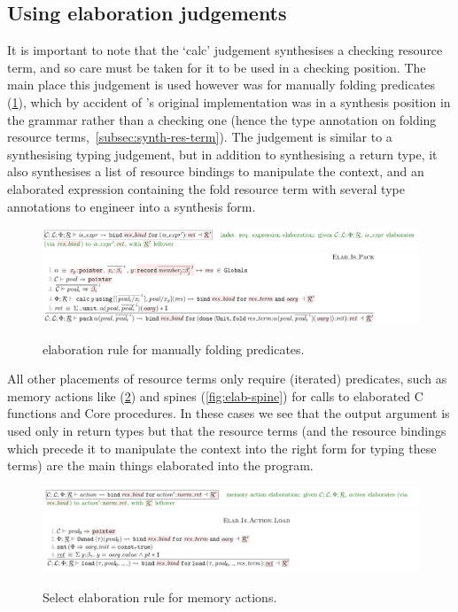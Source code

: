 \subsection{Using elaboration judgements}

It is important to note that the `calc' judgement synthesises a checking
resource term, and so care must be taken for it to be used in a checking
position. The main place this judgement is used however was for manually
folding predicates (\cref{fig:kernel-elab-fold}), which by accident of 's
original implementation was in a synthesis position in the grammar rather than
a checking one (hence the type annotation on folding resource
terms,~\cref{subsec:synth-res-term}). The judgement is similar to a
synthesising typing judgement, but in addition to synthesising a return type,
it also synthesises a list of resource bindings to manipulate the context, and
an elaborated expression containing the fold resource term with several type
annotations to engineer into a synthesis form.

\begin{figure}[tp]
    \includegraphics{figures/kernel-elab-fold-1}
    \includegraphics{figures/kernel-elab-fold-2}
    \caption{ elaboration rule for manually folding
        predicates.}\label{fig:kernel-elab-fold}
\end{figure}

All other placements of resource terms only require (iterated) predicates, such
as memory actions like  (\cref{fig:elab-action}) and spines
(\cref{fig:elab-spine}) for calls to elaborated C functions and Core
procedures. In these cases we see that the output argument is used only in
return types but that the resource terms (and the resource bindings
which precede it to manipulate the context into the right form for typing these
terms) are the main things elaborated into the program.

\begin{figure}[tp]
    \includegraphics{figures/kernel-elab-action-1}
    \includegraphics{figures/kernel-elab-action-2}
    \caption{Select  elaboration rule for memory
        actions.}\label{fig:elab-action}
\end{figure}

